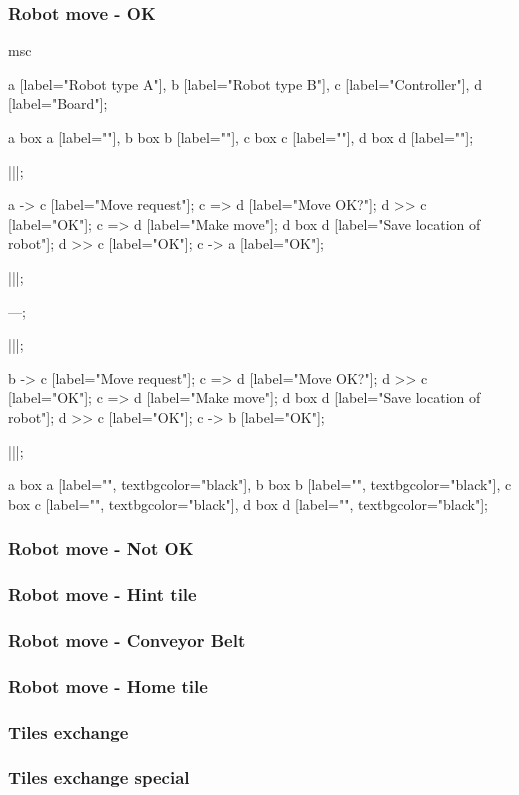 	\subsubsection{Robot move - OK}
	\begin{msc}
		msc
		{

		a [label="Robot type A"],
		b [label="Robot type B"],
		c [label="Controller"],
		d [label="Board"];

		a box a [label=""],
		b box b [label=""],
		c box c [label=""],
		d box d [label=""];

		|||;

		a -> c [label="Move request"];
		c => d [label="Move OK?"];
		d >> c [label="OK"];
		c => d [label="Make move"];
		d box d [label="Save location of robot"];
		d >> c [label="OK"];
		c -> a [label="OK"];

		|||;

		---;

		|||;

		b -> c [label="Move request"];
		c => d [label="Move OK?"];
		d >> c [label="OK"];
		c => d [label="Make move"];
		d box d [label="Save location of robot"];
		d >> c [label="OK"];
		c -> b [label="OK"];

		|||;

		a box a [label="", textbgcolor="black"],
		b box b [label="", textbgcolor="black"],
		c box c [label="", textbgcolor="black"],
		d box d [label="", textbgcolor="black"];

		}
	\end{msc}
	
	\subsubsection{Robot move - Not OK}
	
	
	\subsubsection{Robot move - Hint tile}
	
	
	\subsubsection{Robot move - Conveyor Belt}
	
	
	\subsubsection{Robot move - Home tile}
	
	
	\subsubsection{Tiles exchange}
	
	
	\subsubsection{Tiles exchange special}
	
	